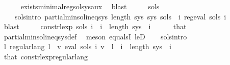\begin{isabellebody}
\ \ \ \ \isamarkupfalse%
\ exists{\isacharunderscore}{\kern0pt}minimal{\isacharunderscore}{\kern0pt}reg{\isacharunderscore}{\kern0pt}sol{\isacharunderscore}{\kern0pt}sys{\isacharunderscore}{\kern0pt}aux\ \isamarkupfalse%
\ blast\isanewline
\ \ \isamarkupfalse%
\ \isamarkupfalse%
\ sols\ \isanewline
\ \ \ \ sols{\isacharunderscore}{\kern0pt}intro{\isacharcolon}{\kern0pt}\ {\isachardoublequoteopen}partial{\isacharunderscore}{\kern0pt}min{\isacharunderscore}{\kern0pt}sol{\isacharunderscore}{\kern0pt}ineq{\isacharunderscore}{\kern0pt}sys\ {\isacharparenleft}{\kern0pt}length\ sys{\isacharparenright}{\kern0pt}\ sys\ sols\ {\isasymand}\ {\isacharparenleft}{\kern0pt}{\isasymforall}i{\isachardot}{\kern0pt}\ reg{\isacharunderscore}{\kern0pt}eval\ {\isacharparenleft}{\kern0pt}sols\ i{\isacharparenright}{\kern0pt}{\isacharparenright}{\kern0pt}{\isachardoublequoteclose}\isanewline
\ \ \ \ \isamarkupfalse%
\ blast\isanewline
\ \ \isamarkupfalse%
\ \isamarkupfalse%
\ {\isachardoublequoteopen}const{\isacharunderscore}{\kern0pt}rlexp\ {\isacharparenleft}{\kern0pt}sols\ i{\isacharparenright}{\kern0pt}{\isachardoublequoteclose}\ \ {\isachardoublequoteopen}i\ {\isacharless}{\kern0pt}\ length\ sys{\isachardoublequoteclose}\ \ i\isanewline
\ \ \ \ \isamarkupfalse%
\ that\ \isamarkupfalse%
\ partial{\isacharunderscore}{\kern0pt}min{\isacharunderscore}{\kern0pt}sol{\isacharunderscore}{\kern0pt}ineq{\isacharunderscore}{\kern0pt}sys{\isacharunderscore}{\kern0pt}def\ \isamarkupfalse%
\ {\isacharparenleft}{\kern0pt}meson\ equals{}I\ leD{\isacharparenright}{\kern0pt}\isanewline
\ \ \isamarkupfalse%
\ sols{\isacharunderscore}{\kern0pt}intro\ \isamarkupfalse%
\ {\isachardoublequoteopen}{\isasymexists}l{\isachardot}{\kern0pt}\ regular{\isacharunderscore}{\kern0pt}lang\ l\ {\isasymand}\ {\isacharparenleft}{\kern0pt}{\isasymforall}v{\isachardot}{\kern0pt}\ eval\ {\isacharparenleft}{\kern0pt}sols\ i{\isacharparenright}{\kern0pt}\ v\ {\isacharequal}{\kern0pt}\ l{\isacharparenright}{\kern0pt}{\isachardoublequoteclose}\ \ {\isachardoublequoteopen}i\ {\isacharless}{\kern0pt}\ length\ sys{\isachardoublequoteclose}\ \ i\isanewline
\ \ \ \ \isamarkupfalse%
\ that\ const{\isacharunderscore}{\kern0pt}rlexp{\isacharunderscore}{\kern0pt}regular{\isacharunderscore}{\kern0pt}lang\ \isamarkupfalse%

\end{isabellebody}
